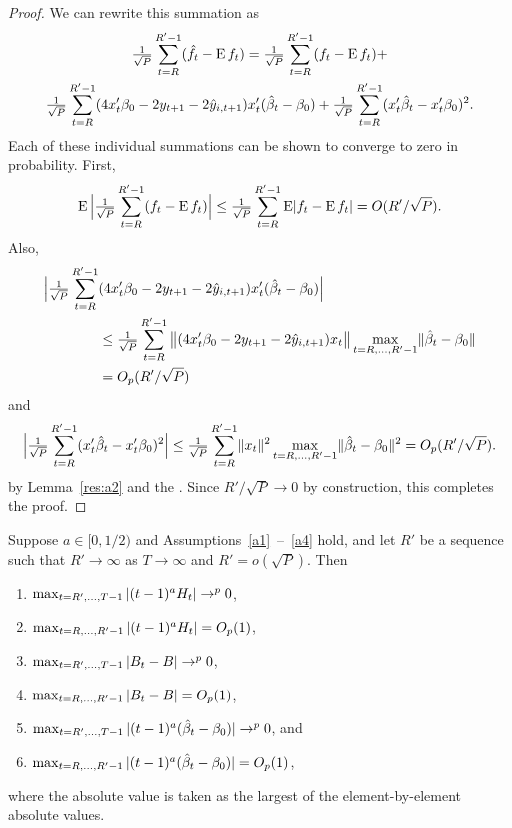 \documentclass[12pt,fleqn]{article}
\begin{document}
\begin{proof}
  We can rewrite this summation as
  \begin{multline*}
    \ocltc{t} (\fh_t - \E f_t) = \ocltc{t} (f_t - \E f_t) + \\
    \ocltc{t} (4 x_t'\btrue - 2 y_{t+1} - 2 \yh_{i,t+1}) x_t'(\bh_t - \btrue)
    + \ocltc{t} (x_t'\bh_t - x_t'\btrue)^2.
  \end{multline*}
  Each of these individual summations can be shown to converge to
  zero in probability. First,
  \begin{equation*}
    \operatorname{E} \Big\lvert \tfrac{1}{\sqrt{P}} \sum_{t=R}^{R'-1} (f_t - \operatorname{E} f_t) \Big\rvert
    \leq \tfrac{1}{\sqrt{P}} \sum_{t=R}^{R'-1} \operatorname{E}\lvert f_t - \operatorname{E} f_t \rvert
    = O(R'/\sqrt{P}).
  \end{equation*}
  Also,
  \begin{align*}
    \Big\lvert \ocltc{t} & (4 x_t'\btrue - 2 y_{t+1} - 2 \yh_{i,t+1}) x_t'(\bh_t - \btrue) \Big\rvert \\
    &\leq \ocltc{t} \big\lVert (4 x_t'\btrue - 2 y_{t+1} - 2 \yh_{i,t+1}) x_t \big\rVert
    \omaxc{t} \lVert  \bh_t - \btrue \rVert \\
    & = O_p(R'/\sqrt{P})
  \end{align*}
  and
  \begin{equation*}
    \Big\lvert \ocltc{t} (x_t'\bh_t - x_t'\btrue)^2 \Big\rvert
    \leq \ocltc{t} \lVert x_t \rVert^2 \omaxc{t} \lVert \bh_t - \btrue \rVert^2
    = O_p(R'/\sqrt{P}).
  \end{equation*}
  by Lemma~\ref{res:a2} and the \lln. Since $R'/\sqrt{P} \to 0$ by
  construction, this completes the proof.
\end{proof}

\begin{alem}\label{res:a2}
  Suppose $a \in [0,1/2)$ and Assumptions~\ref{a1}~--~\ref{a4}
  hold, and let $R'$ be a sequence such that $R' \to \infty$ as $T \to
  \infty$ and $R' = o(\sqrt{P})$. Then
  \begin{enumerate}
  \item $\max_{t=R',\dots,T-1} | (t-1)^a H_t | \to^p 0$,
  \item $\max_{t=R,\dots,R'-1} | (t-1)^a H_t | = O_p(1)$,
  \item $\max_{t=R',\dots,T-1} | B_t - B | \to^p 0$,
  \item $\max_{t=R,\dots,R'-1} | B_t - B | = O_p(1)$,
  \item $\omaxb{t} | (t-1)^a(\bh_t - \btrue) | \to^{p} 0$, and
  \item $\omaxc{t} | (t-1)^a(\bh_t - \btrue) | = O_p(1)$,
  \end{enumerate}
  where the absolute value is taken as the largest of the
  element-by-element absolute values.
\end{alem}
\end{document}

